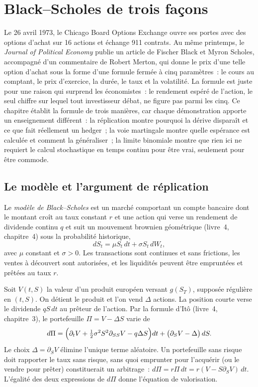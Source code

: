 \chapter{Black--Scholes de trois façons}\label{ch:dv:black-scholes-three-ways}

Le 26 avril 1973, le Chicago Board Options Exchange ouvre ses portes avec
des options d'achat sur 16 actions et échange 911 contrats. Au même printemps, le
\emph{Journal of Political Economy} publie un article de Fischer Black et Myron
Scholes, accompagné d'un commentaire de Robert Merton, qui donne le prix d'une telle option
d'achat sous la forme d'une formule fermée à cinq paramètres~: le cours au comptant,
le prix d'exercice, la durée, le taux et la volatilité. La formule est juste pour une
raison qui surprend les économistes~: le rendement espéré de l'action, le seul chiffre
sur lequel tout investisseur débat, ne figure pas parmi les cinq. Ce chapitre établit
la formule de trois manières, car chaque démonstration apporte un enseignement différent~:
la réplication montre pourquoi la dérive disparaît et ce que fait réellement un hedger~;
la voie martingale montre quelle espérance est calculée et comment la généraliser~;
la limite binomiale montre que rien ici ne requiert le calcul stochastique en temps continu
pour être vrai, seulement pour être commode.

\section{Le modèle et l'argument de réplication}

\begin{definition}\label{def:dv:black-scholes-three-ways:model}
Le \emph{modèle de Black--Scholes} est un marché
comportant un compte bancaire dont le montant croît au taux constant $r$ et une action qui
verse un rendement de dividende continu $q$ et suit un mouvement brownien géométrique (livre~4,
chapitre~4) sous la probabilité historique,
\[
dS_t=\mu S_t\,dt+\sigma S_t\,dW_t,
\]
avec $\mu$ constant et $\sigma>0$. Les transactions sont continues et sans frictions,
les ventes à découvert sont autorisées, et les liquidités peuvent être empruntées et prêtées au taux $r$.
\end{definition}

Soit $V(t,S)$ la valeur d'un produit européen versant $g(S_T)$, supposée régulière en
$(t,S)$. On détient le produit et l'on vend $\Delta$ actions. La position courte verse le
dividende $qS\,dt$ au prêteur de l'action. Par la formule d'Itô (livre~4,
chapitre~3), le portefeuille $\Pi=V-\Delta S$ varie de
\[
d\Pi=\Bigl(\partial_tV+\tfrac12\sigma^2S^2\partial_{SS}V-q\Delta S\Bigr)dt
+\bigl(\partial_SV-\Delta\bigr)\,dS .
\]
Le choix $\Delta=\partial_SV$ élimine l'unique terme aléatoire. Un portefeuille
sans risque doit rapporter le taux sans risque, sans quoi emprunter pour l'acquérir
(ou le vendre pour prêter) constituerait un arbitrage~: $d\Pi=r\Pi\,dt=r(V-S\partial_SV)\,dt$. L'égalité des
deux expressions de $d\Pi$ donne l'équation de valorisation.


